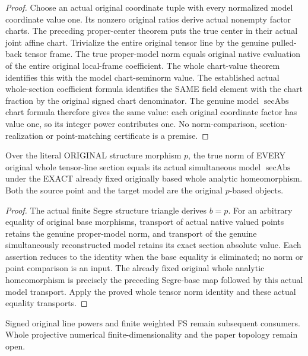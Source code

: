 \begin{proof}
Choose an actual original coordinate tuple with every normalized model coordinate value one. Its nonzero original ratios derive actual nonempty factor charts. The preceding proper-center theorem puts the true center in their actual joint affine chart. Trivialize the entire original tensor line by the genuine pulled-back tensor frame. The true proper-model norm equals original native evaluation of the entire original local-frame coefficient. The whole chart-value theorem identifies this with the model chart-seminorm value. The established actual whole-section coefficient formula identifies the SAME field element with the chart fraction by the original signed chart denominator. The genuine model $\operatorname{secAbs}$ chart formula therefore gives the same value: each original coordinate factor has value one, so its integer power contributes one. No norm-comparison, section-realization or point-matching certificate is a premise.
\end{proof}
\begin{theorem}\label{thm:original-family-original-base-whole-tensor-norm}
\leanok
{}
Over the literal ORIGINAL structure morphism $p$, the true norm of EVERY original whole tensor-line section equals its actual simultaneous model $\operatorname{secAbs}$ under the EXACT already fixed originally based whole analytic homeomorphism. Both the source point and the target model are the original $p$-based objects.
\end{theorem}
\begin{proof}
The actual finite Segre structure triangle derives $b=p$. For an arbitrary equality of original base morphisms, transport of actual native valued points retains the genuine proper-model norm, and transport of the genuine simultaneously reconstructed model retains its exact section absolute value. Each assertion reduces to the identity when the base equality is eliminated; no norm or point comparison is an input. The already fixed original whole analytic homeomorphism is precisely the preceding Segre-base map followed by this actual model transport. Apply the proved whole tensor norm identity and these actual equality transports.
\end{proof}
Signed original line powers and finite weighted FS remain subsequent consumers. Whole projective numerical finite-dimensionality and the paper topology remain open.
